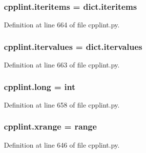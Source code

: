 \subsubsection[{\texorpdfstring{iteritems}{iteritems}}]{\setlength{\rightskip}{0pt plus 5cm}cpplint.\+iteritems = dict.\+iteritems}\hypertarget{namespacecpplint_a4264bdda2adcd8de2c47c06328e7b3cd}{}\label{namespacecpplint_a4264bdda2adcd8de2c47c06328e7b3cd}


Definition at line 664 of file cpplint.\+py.

\subsubsection[{\texorpdfstring{itervalues}{itervalues}}]{\setlength{\rightskip}{0pt plus 5cm}cpplint.\+itervalues = dict.\+itervalues}\hypertarget{namespacecpplint_a147fcba52cedae4991ee5b799777b022}{}\label{namespacecpplint_a147fcba52cedae4991ee5b799777b022}


Definition at line 663 of file cpplint.\+py.

\subsubsection[{\texorpdfstring{long}{long}}]{\setlength{\rightskip}{0pt plus 5cm}cpplint.\+long = int}\hypertarget{namespacecpplint_ab015cd61a1d1e48b317bd2a0be747e11}{}\label{namespacecpplint_ab015cd61a1d1e48b317bd2a0be747e11}


Definition at line 658 of file cpplint.\+py.

\subsubsection[{\texorpdfstring{xrange}{xrange}}]{\setlength{\rightskip}{0pt plus 5cm}cpplint.\+xrange = range}\hypertarget{namespacecpplint_aa354ba81f1673ed31f2c0d7ce1f05f5e}{}\label{namespacecpplint_aa354ba81f1673ed31f2c0d7ce1f05f5e}


Definition at line 646 of file cpplint.\+py.

